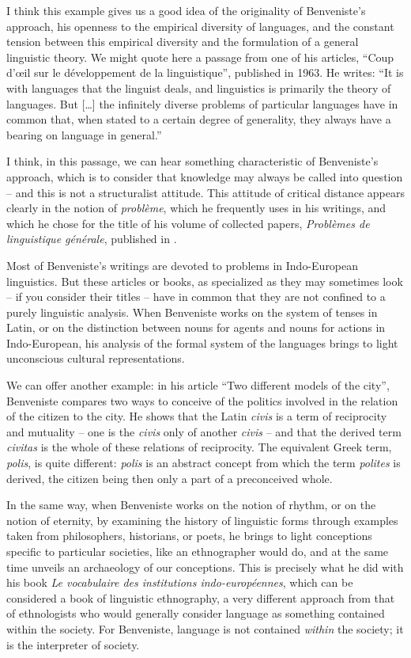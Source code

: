 \documentclass[output=paper]{langscibook}
\begin{document}
I think this example gives us a good idea of the originality of Benveniste’s approach, his openness to the empirical diversity of languages, and the constant tension between this empirical diversity and the formulation of a general linguistic theory. We might quote here a passage from one of his articles, “Coup d’œil sur le développement de la linguistique”, published in 1963. He writes: “It is with languages that the linguist deals, and linguistics is primarily the theory of languages. But […] the infinitely diverse problems of particular languages have in common that, when stated to a certain degree of generality, they always have a bearing on language in general.” 

I think, in this passage, we can hear something characteristic of Benveniste’s approach, which is to consider that knowledge may always be called into question – and this is not a structuralist attitude. This attitude of critical distance appears clearly in the notion of \textit{problème}, which he frequently uses in his writings, and which he chose for the title of his volume of collected papers, \textit{Problèmes de linguistique générale}, published in \citeyear{benveniste1966a}. 

Most of Benveniste’s writings are devoted to problems in Indo-European linguistics. But these articles or books, as specialized as they may sometimes look -- if you consider their titles -- have in common that they are not confined to a purely linguistic analysis. When Benveniste works on the system of tenses in Latin, or on the distinction between nouns for agents and nouns for actions in Indo-European, his analysis of the formal system of the languages brings to light unconscious cultural representations. 

We can offer another example: in his article “Two different models of the city”, Benveniste compares two ways to conceive of the politics involved in the relation of the citizen to the city. He shows that the Latin \textit{civis} is a term of reciprocity and mutuality – one is the \textit{civis} only of another \textit{civis} – and that the derived term \textit{civitas} is the whole of these relations of reciprocity. The equivalent Greek term, \textit{polis}, is quite different: \textit{polis} is an abstract concept from which the term \textit{polites} is derived, the citizen being then only a part of a preconceived whole.

In the same way, when Benveniste works on the notion of rhythm, or on the notion of eternity, by examining the history of linguistic forms through examples taken from philosophers, historians, or poets, he brings to light conceptions specific to particular societies, like an ethnographer would do, and at the same time unveils an archaeology of our conceptions. This is precisely what he did with his book \textit{Le vocabulaire des institutions indo-européennes}, which can be considered a book of linguistic ethnography, a very different approach from that of ethnologists who would generally consider language as something contained within the society. For Benveniste, language is not contained \textit{within} the society; it is the interpreter of society.
\end{document}
